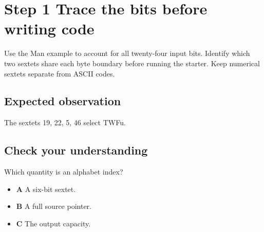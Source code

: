 \section{Step 1 Trace the bits before writing code}\label{base64-s01}

Use the Man example to account for all twenty-four input bits. Identify which two sextets share each byte boundary before running the starter. Keep numerical sextets separate from ASCII codes.

\subsection{Expected observation}
The sextets 19, 22, 5, 46 select TWFu.

\subsection{Check your understanding}
Which quantity is an alphabet index?

\begin{itemize}
\item \textbf{A} A six-bit sextet.
\item \textbf{B} A full source pointer.
\item \textbf{C} The output capacity.
\end{itemize}
